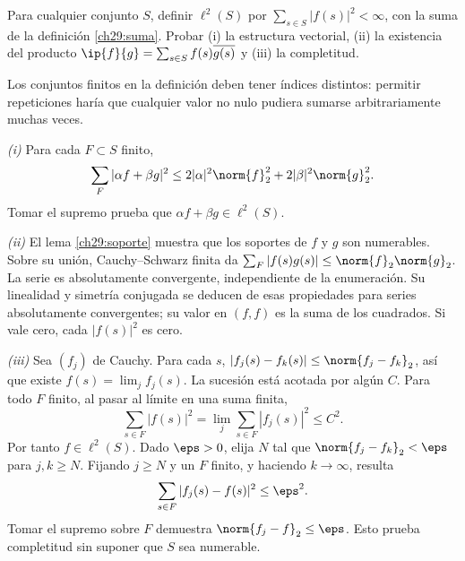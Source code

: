 \begin{ejercicio}\label{ej:lectura-29-8}
Para cualquier conjunto $S$, definir $\ell^{2}(S)$ por $\sum_{s\in S}|f(s)|^{2}<\infty$, con la suma de la definición \ref{ch29:suma}. Probar (i) la estructura vectorial, (ii) la existencia del producto $\ip{f}{g}=\sum_{s\in S}f(s)\overline{g(s)}$ y (iii) la completitud.
\end{ejercicio}
\begin{solucion}
Los conjuntos finitos en la definición deben tener índices distintos: permitir repeticiones haría que cualquier valor no nulo pudiera sumarse arbitrariamente muchas veces.

\emph{(i)} Para cada $F\subset S$ finito,
\[
 \sum_F|\alpha f+\beta g|^{2}
 \leq2|\alpha|^{2}\norm{f}_2^{2}+2|\beta|^{2}\norm{g}_2^{2}.
\]
Tomar el supremo prueba que $\alpha f+\beta g\in\ell^{2}(S)$.

\emph{(ii)} El lema \ref{ch29:soporte} muestra que los soportes de $f$ y $g$ son numerables. Sobre su unión, Cauchy--Schwarz finita da $\sum_F|f(s)g(s)|\leq\norm{f}_2\norm{g}_2$. La serie es absolutamente convergente, independiente de la enumeración. Su linealidad y simetría conjugada se deducen de esas propiedades para series absolutamente convergentes; su valor en $(f,f)$ es la suma de los cuadrados. Si vale cero, cada $|f(s)|^{2}$ es cero.

\emph{(iii)} Sea $(f_j)$ de Cauchy. Para cada $s$, $|f_j(s)-f_k(s)|\leq\norm{f_j-f_k}_2$, así que existe $f(s)=\lim_j f_j(s)$. La sucesión está acotada por algún $C$. Para todo $F$ finito, al pasar al límite en una suma finita,
\[
 \sum_{s\in F}|f(s)|^{2}=\lim_j\sum_{s\in F}|f_j(s)|^{2}\leq C^{2}.
\]
Por tanto $f\in\ell^{2}(S)$. Dado $\eps>0$, elija $N$ tal que $\norm{f_j-f_k}_2<\eps$ para $j,k\geq N$. Fijando $j\geq N$ y un $F$ finito, y haciendo $k\to\infty$, resulta
\[
 \sum_{s\in F}|f_j(s)-f(s)|^{2}\leq\eps^{2}.
\]
Tomar el supremo sobre $F$ demuestra $\norm{f_j-f}_2\leq\eps$. Esto prueba completitud sin suponer que $S$ sea numerable.
\end{solucion}

